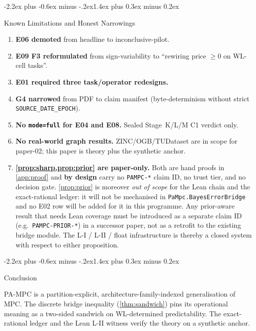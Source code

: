 \documentclass[10pt]{article}
\makeatletter
\def\section{\@startsection{section}{1}{\z@}%
  {-2.2ex plus -0.6ex minus -.2ex}{1.4ex plus 0.3ex minus 0.2ex}%
  {\normalsize\bf\raggedright\sffamily}}
\theoremstyle{definition}
\theoremstyle{remark}
\makeatother
\begin{document}
\section{Known Limitations and Honest Narrowings}\label{sec:limits}

\begin{enumerate}
\item \textbf{E06 demoted} from headline to inconclusive-pilot.
\item \textbf{E09 F3 reformulated} from sign-variability to
  ``rewiring price $\ge 0$ on WL-cell tasks''.
\item \textbf{E01 required three task/operator redesigns.}
\item \textbf{G4 narrowed} from PDF to claim manifest
  (byte-determinism without strict \verb|SOURCE_DATE_EPOCH|).
\item \textbf{No \texttt{mode=full} for E04 and E08.} Sealed
  Stage~K/L/M C1 verdict only.
\item \textbf{No real-world graph results.} ZINC/OGB/TUDataset are
  in scope for paper-02; this paper is theory plus the synthetic
  anchor.
\item \textbf{\cref{prop:sharp,prop:prior} are paper-only.} Both are
  hand proofs in \cref{app:proof} and \textbf{by design} carry no
  \verb|PAMPC-*| claim ID, no trust tier, and no decision gate.
  \cref{prop:prior} is moreover \emph{out of scope} for the Lean
  chain and the exact-rational ledger: it will not be mechanised in
  \verb|PaMpc.BayesErrorBridge| and no E02 row will be added for it
  in this programme. Any prior-aware result that needs Lean coverage
  must be introduced as a separate claim ID (e.g.\
  \verb|PAMPC-PRIOR-*|) in a successor paper, not as a retrofit to
  the existing bridge module. The L-I / L-II / float infrastructure
  is thereby a closed system with respect to either proposition.
\end{enumerate}

\section{Conclusion}\label{sec:conclusion}

PA-MPC is a partition-explicit, architecture-family-indexed
generalisation of MPC. The discrete bridge inequality
(\cref{thm:sandwich}) pins its operational meaning as a two-sided
sandwich on WL-determined predictability. The exact-rational ledger
and the Lean L-II witness verify the theory on a synthetic anchor.
\end{document}
